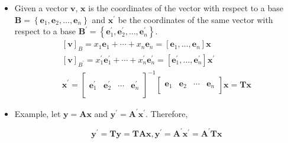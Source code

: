\documentclass[12pt,thmsa]{article}
\begin{document}
\begin{itemize}
	\item Given a vector \(\boldsymbol{v}\), \(\boldsymbol{x}\) is the coordinates of the vector with respect to a base \(\boldsymbol{B} =\left\{\boldsymbol{e}_{1}, \boldsymbol{e}_{2}, \ldots, \boldsymbol{e}_{n}\right\}\) and \(\boldsymbol{x}^{\prime}\) be the coordinates of the same vector with respect to a base \( \boldsymbol{B}^{\prime} = \left\{\boldsymbol{e}_{1}^{\prime}, \boldsymbol{e}_{2}^{\prime}, \ldots, \boldsymbol{e}_{n}^{\prime}\right\}\).
	\begin{equation*}
		\begin{gathered}
		\left[ \boldsymbol{v} \right]_{B}=x_1 \boldsymbol{e}_1+\cdots+x_n \boldsymbol{e}_n=\left[\boldsymbol{e}_1, \ldots, \boldsymbol{e}_n\right] \boldsymbol{x}  \\
		\left[ \boldsymbol{v} \right]_{B^{\prime}}=x_1^{\prime} \boldsymbol{e}_1^{\prime}+\cdots+x_n^{\prime} \boldsymbol{e}_n^{\prime} = \left[\boldsymbol{e}_1^{\prime}, \ldots, \boldsymbol{e}_n^{\prime}\right] \boldsymbol{x}^{\prime} \\
		\boldsymbol{x}^{\prime} = \left[ \begin{array}{cccc}
			 &  &   &  \\
			\boldsymbol{e}_1^{\prime} & \boldsymbol{e}_2^{\prime} & \cdots & \boldsymbol{e}_n^{\prime} \\
			 &  &   &  
		\end{array} \right]^{-1}
		\left[ \begin{array}{cccc}
			 &  &   &  \\
			\boldsymbol{e}_1 & \boldsymbol{e}_2 & \cdots & \boldsymbol{e}_n \\
			 &  &   &  
		\end{array} \right] \boldsymbol{x}=\boldsymbol{T} \boldsymbol{x}
		\end{gathered}
	\end{equation*}

	\item Example, let \(\boldsymbol{y}=\boldsymbol{A} \boldsymbol{x}\) and \(\boldsymbol{y}^{\prime}=\boldsymbol{A}^{\prime} \boldsymbol{x}^{\prime}\). Therefore,
	
	\begin{equation*}
		\boldsymbol{y}^{\prime}=\boldsymbol{T} \boldsymbol{y}=\boldsymbol{T} \boldsymbol{A} \boldsymbol{x}, 	\boldsymbol{y}^{\prime}=\boldsymbol{A}^{\prime} \boldsymbol{x}^{\prime}=\boldsymbol{A}^{\prime} \boldsymbol{T} \boldsymbol{x}
	\end{equation*}
	

\end{itemize}
\end{document}
